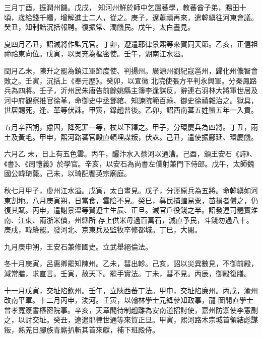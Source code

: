 \begin{pinyinscope}
 三月丁酉，振潤州饑。戊戌，
 知河州鮮於師中乞置蕃學，教蕃酋子弟，賜田十頃，歲給錢千緡，增解進士二人，從之。庚子，遼蕭禧再來，遣韓縝往河東會議。癸丑，知制誥沉括報聘。復振常、潤饑民。戊午，太白晝見。



 夏四月乙丑，詔減將作監冗官。丁卯，遼遣耶律景熙等來賀同天節。乙亥，正僖祖禘祫東向位。戊寅，以吳充為樞密使。壬午，湖南江水溢。



 閏月乙未，陳升之罷為鎮江軍節度使、判揚州。廣源州劉紀寇邕州，歸化州儂智會敗之。壬寅，沉括上《奉元歷》。癸卯，以宣徽
 北院使張方平判永興軍。分秦鳳路兵為四將。壬子，沂州民朱唐告前餘姚縣主簿李逢謀反，辭連右羽林大將軍世居及河中府觀察推官徐革，命御史中丞鄧綰、知諫院範百祿、御史徐禧雜治之。獄具，世居賜死，逢、革等伏誅。甲寅，錄趙普後。乙卯，詔西南蕃五姓蠻五年一入貢。



 五月辛酉朔，慮囚，降死罪一等，杖以下釋之。甲子，分環慶兵為四將。丁丑，雨土及黃毛。甲申，熙河路蕃官殿直頓埋謀叛，伏誅。己丑，遣使振鄜延、環慶饑。



 六月乙
 未，日上有五色雲。丙午，釃汴水入蔡河以通漕。己酉，頒王安石《詩》、《書》、《周禮義》於學官。辛亥，以安石為尚書左僕射兼門下侍郎。戊午，太師魏國公韓琦薨。己未，以琦配饗英宗廟庭。



 秋七月甲子，虔州江水溢。戊寅，太白晝見。戊子，分涇原兵為五將。命韓縝如河東割地。八月庚寅朔，日當食，雲陰不見。癸巳，募民捕蝗易粟，苗損者償之，仍復其賦。丙申，遣謝景溫等賀遼主生辰、正旦。減官戶役錢之半。詔發運司體實淮南、江東、兩浙米價，州縣所
 存上供米毋過百萬石，減直予民，斗錢勿過八十。庚戌，韓絳罷。發河北、京東兵及監牧卒修都城。丁巳，大閱。



 九月庚申朔，王安石兼修國史。立武舉絕倫法。



 冬十月庚寅，呂惠卿罷知陳州。乙未，彗出軫。己亥，詔以災異數見，不御前殿，減常膳，求直言。壬寅，赦天下。罷手實法。丁未，彗不見。丙辰，御殿復膳。



 十一月戊寅，交址陷欽州。壬午，立陜西蕃丁法。甲申，交址陷廉州。丙戌，渝州改南平軍。十二月丙申，浚河。壬寅，以翰林學士元絳參知政事，龍
 圖閣直學士曾孝寬簽書樞密院事。辛亥，天章閣待制趙離為安南道招討使，嘉州防禦使李憲副之，以討交址。癸丑，遼遣耶律世通等來賀正旦。甲寅，熙河路木宗城首領結彪謀叛，熟羌日腳族青廝扒斬其首來獻，補下班殿侍。




\end{pinyinscope}
